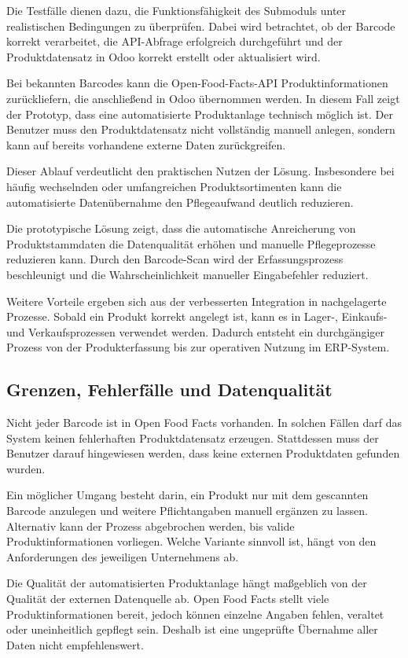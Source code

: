 \documentclass[12pt,a4paper]{article}
\begin{document}
Die Testfälle dienen dazu, die Funktionsfähigkeit des Submoduls unter realistischen Bedingungen zu überprüfen. Dabei wird betrachtet, ob der Barcode korrekt verarbeitet, die API-Abfrage erfolgreich durchgeführt und der Produktdatensatz in Odoo korrekt erstellt oder aktualisiert wird.

Bei bekannten Barcodes kann die Open-Food-Facts-API Produktinformationen zurückliefern, die anschließend in Odoo übernommen werden. In diesem Fall zeigt der Prototyp, dass eine automatisierte Produktanlage technisch möglich ist. Der Benutzer muss den Produktdatensatz nicht vollständig manuell anlegen, sondern kann auf bereits vorhandene externe Daten zurückgreifen.

Dieser Ablauf verdeutlicht den praktischen Nutzen der Lösung. Insbesondere bei häufig wechselnden oder umfangreichen Produktsortimenten kann die automatisierte Datenübernahme den Pflegeaufwand deutlich reduzieren.

Die prototypische Lösung zeigt, dass die automatische Anreicherung von Produktstammdaten die Datenqualität erhöhen und manuelle Pflegeprozesse reduzieren kann. Durch den Barcode-Scan wird der Erfassungsprozess beschleunigt und die Wahrscheinlichkeit manueller Eingabefehler reduziert.

Weitere Vorteile ergeben sich aus der verbesserten Integration in nachgelagerte Prozesse. Sobald ein Produkt korrekt angelegt ist, kann es in Lager-, Einkaufs- und Verkaufsprozessen verwendet werden. Dadurch entsteht ein durchgängiger Prozess von der Produkterfassung bis zur operativen Nutzung im ERP-System.

\subsection{Grenzen, Fehlerfälle und Datenqualität}

Nicht jeder Barcode ist in Open Food Facts vorhanden. In solchen Fällen darf das System keinen fehlerhaften Produktdatensatz erzeugen. Stattdessen muss der Benutzer darauf hingewiesen werden, dass keine externen Produktdaten gefunden wurden.

Ein möglicher Umgang besteht darin, ein Produkt nur mit dem gescannten Barcode anzulegen und weitere Pflichtangaben manuell ergänzen zu lassen. Alternativ kann der Prozess abgebrochen werden, bis valide Produktinformationen vorliegen. Welche Variante sinnvoll ist, hängt von den Anforderungen des jeweiligen Unternehmens ab.

Die Qualität der automatisierten Produktanlage hängt maßgeblich von der Qualität der externen Datenquelle ab. Open Food Facts stellt viele Produktinformationen bereit, jedoch können einzelne Angaben fehlen, veraltet oder uneinheitlich gepflegt sein. Deshalb ist eine ungeprüfte Übernahme aller Daten nicht empfehlenswert.
\end{document}
